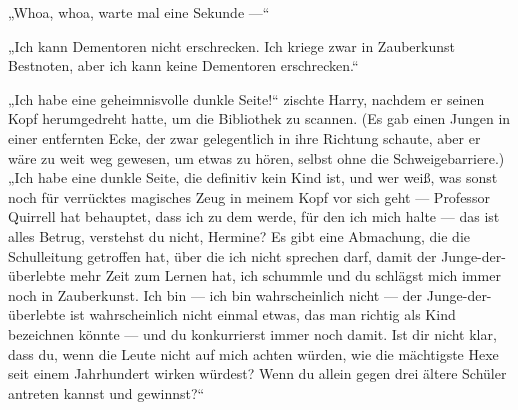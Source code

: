 „Whoa, whoa, warte mal eine Sekunde —“

„Ich kann Dementoren nicht erschrecken. Ich kriege zwar in Zauberkunst Bestnoten, aber ich kann keine Dementoren erschrecken.“

„Ich habe eine geheimnisvolle dunkle Seite!“ zischte Harry, nachdem er seinen Kopf herumgedreht hatte, um die Bibliothek zu scannen. (Es gab einen Jungen in einer entfernten Ecke, der zwar gelegentlich in ihre Richtung schaute, aber er wäre zu weit weg gewesen, um etwas zu hören, selbst ohne die Schweigebarriere.)
„Ich habe eine dunkle Seite, die definitiv kein Kind ist, und wer weiß, was sonst noch für verrücktes magisches Zeug in meinem Kopf vor sich geht — Professor Quirrell hat behauptet, dass ich zu dem werde, für den ich mich halte — das ist alles Betrug, verstehst du nicht, Hermine? Es gibt eine Abmachung, die die Schulleitung getroffen hat, über die ich nicht sprechen darf, damit der Junge-der-überlebte mehr Zeit zum Lernen hat, ich schummle und du schlägst mich immer noch in Zauberkunst. Ich bin — ich bin wahrscheinlich nicht — der Junge-der-überlebte ist wahrscheinlich nicht einmal etwas, das man richtig als Kind bezeichnen könnte — und du konkurrierst immer noch damit. Ist dir nicht klar, dass du, wenn die Leute nicht auf mich achten würden, wie die mächtigste Hexe seit einem Jahrhundert wirken würdest? Wenn du allein gegen drei ältere Schüler antreten kannst und gewinnst?“

